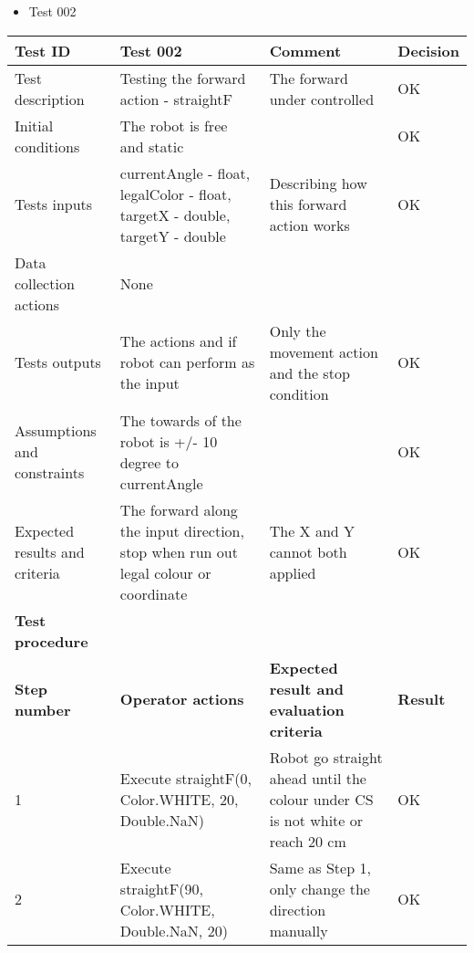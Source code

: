 \documentclass[11pt, a4paper]{article}
\begin{document}
\begin{itemize}
\item {Test 002}\\
\end{itemize}

\begin{tabular} 
	 {|p{4cm}|p{4.5cm}|p{4.5cm}|p{1.5cm}|}
\hline
\textbf{Test ID} & \textbf{Test 002} & \textbf{Comment} & \textbf{Decision}\\
\hline
{Test description} & {Testing the forward action - straightF} & {The forward under controlled} & {OK}\\
\hline
{Initial conditions} & {The robot is free and static} & {} & {OK}\\
\hline
{Tests inputs} & {currentAngle - float, \newline legalColor - float, \newline targetX - double, \newline targetY - double
} & {Describing how this forward \newline action works} & {OK}\\
\hline
{Data collection actions} & {None} & {} & {}\\
\hline
{Tests outputs} & {The actions and if robot can \newline perform as the input} & {Only the movement action and the stop condition} & {OK}\\
\hline
{Assumptions and constraints} & {The towards of the robot is \newline +/- 10 degree to currentAngle} & {} & {OK}\\
\hline
{Expected results and criteria} & {The forward along the input \newline direction, stop when run out \newline legal colour or coordinate} & {The X and Y cannot both \newline applied} & {OK}\\
\hline
\textbf{Test procedure} & \textbf{} & \textbf{} & \textbf{}\\
\hline
\textbf{Step number} & \textbf{Operator actions} & \textbf{Expected result and \newline evaluation criteria} & \textbf{Result}\\
\hline
{1} & {Execute \newline straightF(0, Color.WHITE, 20, Double.NaN)} & {Robot go straight ahead until the colour under CS is not white or reach 20 cm} & {OK}\\
\hline
{2} & {Execute \newline straightF(90, Color.WHITE, \newline Double.NaN, 20)} & {Same as Step 1, only change the direction manually} & {OK}\\
\hline
\end{tabular}
\newpage
\end{document}
